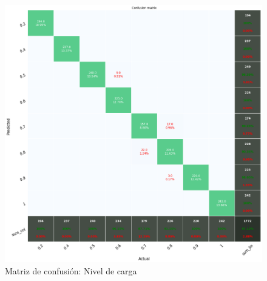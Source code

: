 \begin{itemize}
    \begin{figure}[H]
        \centering
        \includegraphics[width=150mm]{3/Fotos/CM_Load_OBR.png}
        \captionsetup{justification=centering,margin=1.25cm}
        \caption{Matriz de confusión: Nivel de carga}
        \label{fig:CM_OBR_Load}
    \end{figure}      
    
    
\end{itemize}
	



    
    
